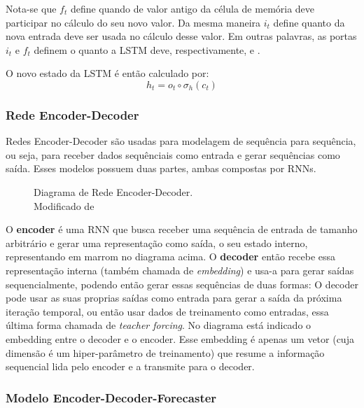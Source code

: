 Nota-se que $f_t$
define quando de valor antigo da célula de memória deve participar no cálculo do
seu novo valor. 
Da mesma maneira $i_t$ define quanto da nova entrada deve ser usada no cálculo desse valor.
Em outras palavras, as portas $i_t$ e $f_t$ definem o quanto a LSTM deve,
respectivamente,  e .


O novo estado da LSTM é então calculado por: \\
\[h_t = o_t \circ \sigma_h(c_t)\]


\subsubsection{Rede Encoder-Decoder}

Redes Encoder-Decoder são usadas para modelagem de sequência para
sequência, ou seja, para receber dados sequênciais como entrada e gerar
sequências como saída. Esses modelos possuem duas partes, ambas compostas por
RNNs. \\

\begin{figure}[H]
\centering

\caption{ Diagrama de Rede Encoder-Decoder.\\ Modificado de \cite{encdec}}

\end{figure}
  
O \textbf{encoder} é uma RNN que busca receber uma sequência de entrada de
tamanho arbitrário e gerar uma representação como saída, o seu estado interno,
representando em marrom no diagrama acima. O \textbf{decoder} então recebe essa representação interna (também chamada
de \textit{embedding}) e usa-a para gerar saídas sequencialmente, podendo
então gerar essas sequências de duas formas: O decoder pode usar as suas proprias saídas
como entrada para gerar a saída da próxima iteração temporal, ou então usar dados de treinamento como
entradas, essa última forma chamada de \textit{teacher forcing}. No diagrama
está indicado o embedding entre o decoder e o encoder. Esse embedding é apenas
um vetor (cuja dimensão é um hiper-parâmetro de treinamento) que resume a
informação sequencial lida pelo encoder e a transmite para o decoder. 




\subsubsection{Modelo Encoder-Decoder-Forecaster}

